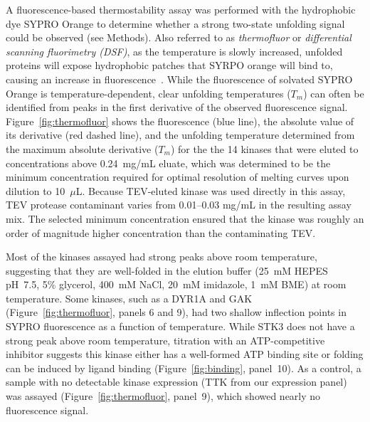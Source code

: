 \documentclass[phd,tocprelim]{cornell}
\begin{document}
A fluorescence-based thermostability assay was performed with the hydrophobic dye SYPRO Orange to determine whether a strong two-state unfolding signal could be observed (see Methods). 
Also referred to as \emph{thermofluor} or \emph{differential scanning fluorimetry (DSF)}, as the temperature is slowly increased, unfolded proteins will expose hydrophobic patches that SYRPO orange will bind to, causing an increase in fluorescence~\citep{Lo:2004gy,Ericsson:2006dx,Matulis:2005dq}.
While the fluorescence of solvated SYPRO Orange is temperature-dependent, clear unfolding temperatures ($T_m$) can often be identified from peaks in the first derivative of the observed fluorescence signal.
Figure~\ref{fig:thermofluor} shows the fluorescence (blue line), the absolute value of its derivative (red dashed line), and the unfolding temperature determined from the maximum absolute derivative ($T_m$) for the the 14 kinases that were eluted to concentrations above 0.24~mg/mL eluate, which was determined to be the minimum concentration required for optimal resolution of melting curves upon dilution to 10~$\mu$L. Because TEV-eluted kinase was used directly in this assay, TEV protease contaminant varies from 0.01--0.03 mg/mL in the resulting assay mix. The selected minimum concentration ensured that the kinase was roughly an order of magnitude higher concentration than the contaminating TEV. 

Most of the kinases assayed had strong peaks above room temperature, suggesting that they are well-folded in the elution buffer (25~mM HEPES pH~7.5, 5\% glycerol, 400~mM NaCl, 20~mM imidazole, 1~mM BME) at room temperature. 
Some kinases, such as a DYR1A and GAK (Figure~\ref{fig:thermofluor}, panels 6 and 9), had two shallow inflection points in SYPRO fluorescence as a function of temperature. 
While STK3 does not have a strong peak above room temperature, titration with an ATP-competitive inhibitor suggests this kinase either has a well-formed ATP binding site or folding can be induced by ligand binding (Figure~\ref{fig:binding}, panel~10). 
As a control, a sample with no detectable kinase expression (TTK from our expression panel) was assayed (Figure~\ref{fig:thermofluor}, panel~9), which showed nearly no fluorescence signal. 
\end{document}
